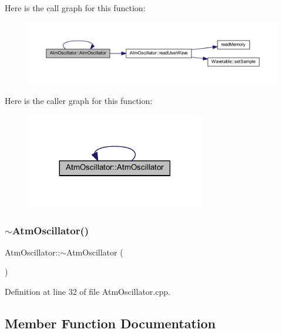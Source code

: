 Here is the call graph for this function\+:
\nopagebreak
\begin{figure}[H]
\begin{center}
\leavevmode
\includegraphics[width=350pt]{class_atm_oscillator_a864b35c83864a6d5045f9dbb42fa862e_cgraph}
\end{center}
\end{figure}
Here is the caller graph for this function\+:
\nopagebreak
\begin{figure}[H]
\begin{center}
\leavevmode
\includegraphics[width=221pt]{class_atm_oscillator_a864b35c83864a6d5045f9dbb42fa862e_icgraph}
\end{center}
\end{figure}
\mbox{\label{class_atm_oscillator_a3d5b959eff3a2cb4fa3200cadeb2ab0b}} 
\subsubsection{\texorpdfstring{$\sim$\+Atm\+Oscillator()}{~AtmOscillator()}}
{\footnotesize\ttfamily Atm\+Oscillator\+::$\sim$\+Atm\+Oscillator (\begin{DoxyParamCaption}{ }\end{DoxyParamCaption})}



Definition at line 32 of file Atm\+Oscillator.\+cpp.



\subsection{Member Function Documentation}
\mbox{\label{class_atm_oscillator_ab0b1ab90e227ced30ddffff96bec6427}} 
